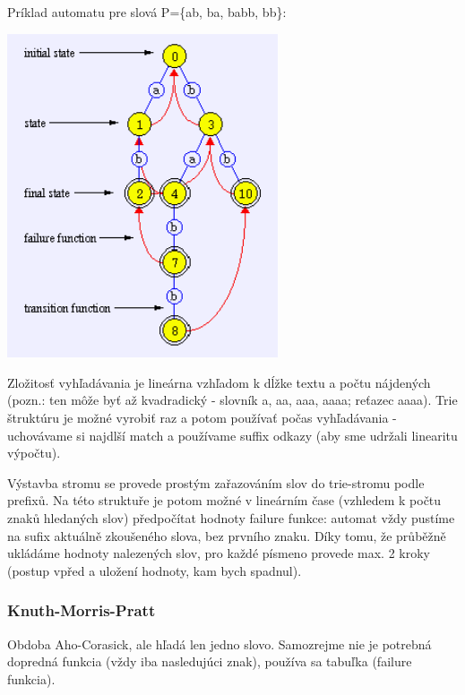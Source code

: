 Príklad  automatu pre slová P=\{ab, ba, babb, bb\}:

\par\begin{center}\includegraphics[width=8cm]{informatika/algoritmy_a_ds/obrazky/ahocorasick-automatron.png}\end{center}

Zložitosť vyhľadávania je lineárna vzhľadom k dĺžke textu a počtu nájdených  (pozn.: ten môže byť až kvadradický - slovník a, aa, aaa, aaaa; reťazec aaaa). Trie štruktúru je možné vyrobiť raz a potom používať počas vyhľadávania - uchovávame si najdlší match a používame suffix odkazy (aby sme udržali linearitu výpočtu).

Výstavba stromu se provede prostým zařazováním slov do trie-stromu podle prefixů. Na této struktuře je potom možné v lineárním čase (vzhledem k počtu znaků hledaných slov) předpočítat hodnoty failure funkce: automat vždy pustíme na sufix aktuálně zkoušeného slova, bez prvního znaku. Díky tomu, že průběžně ukládáme hodnoty nalezených slov, pro každé písmeno provede max. 2 kroky (postup vpřed a uložení hodnoty, kam bych spadnul).


\subsubsection*{Knuth-Morris-Pratt}

Obdoba Aho-Corasick, ale hľadá len jedno slovo. Samozrejme nie je potrebná dopredná funkcia (vždy iba nasledujúci znak), používa sa  tabuľka (failure funkcia).

